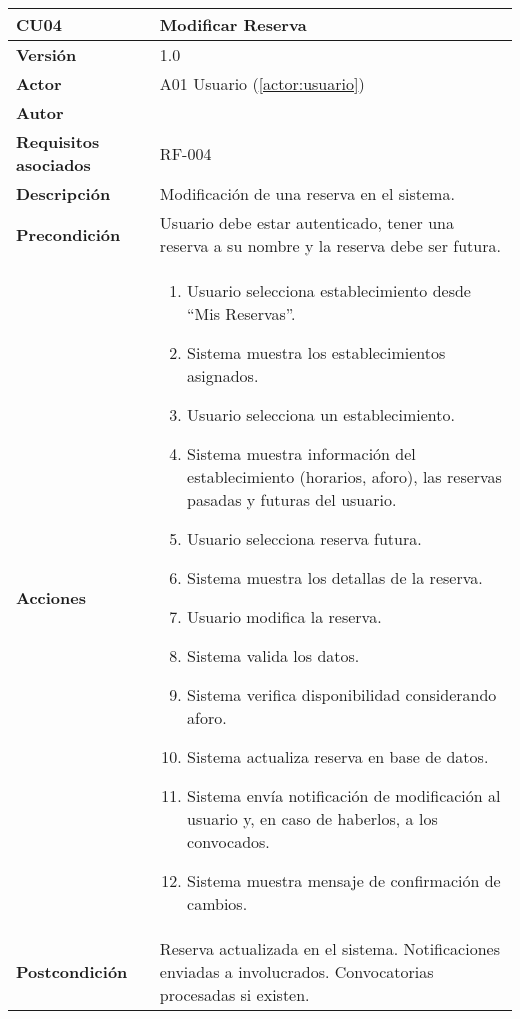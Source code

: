 \begin{table}[H]
	\centering
	\begin{tabularx}{\linewidth}{ p{} p{} }
		\toprule
		\textbf{CU04}    & \textbf{Modificar Reserva} \\
		\toprule
		\textbf{Versión}              & 1.0    \\
		\textbf{Actor}                & A01 Usuario (\ref{actor:usuario}) \\
		\textbf{Autor}                & \nombre \\
		\textbf{Requisitos asociados} & RF-004 \\
		\textbf{Descripción}          & Modificación de una reserva en el sistema. \\
		\textbf{Precondición}         & Usuario debe estar autenticado, tener una reserva a su nombre y la reserva debe ser futura. \\
		\textbf{Acciones}             &
		\begin{enumerate}
			\def\labelenumi{\arabic{enumi}.}
			\tightlist
			\item Usuario selecciona establecimiento desde ``Mis Reservas''.
            \item Sistema muestra los establecimientos asignados.
            \item Usuario selecciona un establecimiento.
            \item Sistema muestra información del establecimiento (horarios, aforo), las reservas pasadas y futuras del usuario.
            \item Usuario selecciona reserva futura.
            \item Sistema muestra los detallas de la reserva.
            \item Usuario modifica la reserva.
            \item Sistema valida los datos.
            \item Sistema verifica disponibilidad considerando aforo.
            \item Sistema actualiza reserva en base de datos.
            \item Sistema envía notificación de modificación al usuario y, en caso de haberlos, a los convocados.
            \item Sistema muestra mensaje de confirmación de cambios.
		\end{enumerate}\\
		\textbf{Postcondición}        & Reserva actualizada en el sistema. Notificaciones enviadas a involucrados. Convocatorias procesadas si existen.\\

\end{tabularx}
\end{table}
